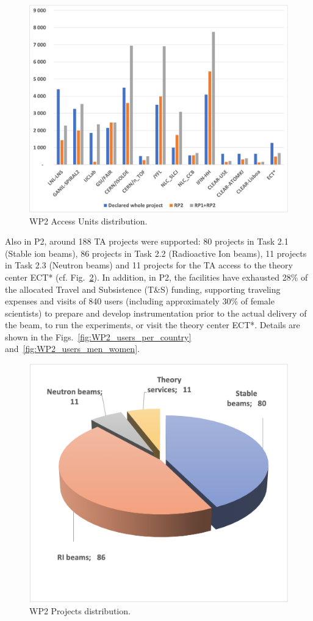 \begin{figure}[!h]
    \centering
    \includegraphics[width=0.8\linewidth]{graphics/WP2_AU_statistics.png}
    \caption{WP2 Access Units distribution.}
    \label{fig:WP2_AU_statistics}
\end{figure}

Also in P2, around 188 TA projects were supported: 80 projects in Task 2.1 (Stable ion beams), 86 projects in Task 2.2 (Radioactive Ion beams), 11 projects in Task 2.3 (Neutron beams) and 11 projects for the TA access to the theory center ECT* (cf. Fig.~\ref{fig:WP2_projects}).  In addition, in P2, the facilities have exhausted 28\% of the allocated Travel and Subsistence (T\&S) funding, supporting traveling expenses and visits of 840 users (including approximately 30\% of female scientists) to prepare and develop instrumentation prior to the actual delivery of the beam, to run the experiments, or visit the theory center ECT*. Details are shown in the Figs.~\ref{fig:WP2_users_per_country} and~\ref{fig:WP2_users_men_women}. 

\begin{figure}[!h]
    \centering
    \includegraphics[width=0.7\linewidth]{graphics/WP2_projects.png}
    \caption{WP2 Projects distribution.}
    \label{fig:WP2_projects}
\end{figure}



